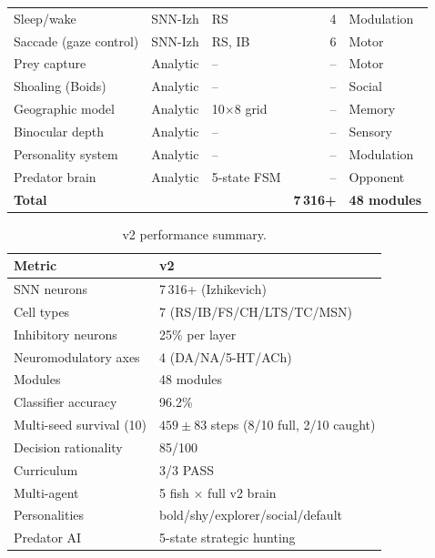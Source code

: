 \documentclass[12pt]{article}
\begin{document}
\begin{table}[H]
\begin{tabular}{lllrl}
Sleep/wake                & SNN-Izh   & RS          & 4      & Modulation \\
Saccade (gaze control)    & SNN-Izh   & RS, IB      & 6      & Motor \\
Prey capture              & Analytic  & --          & --     & Motor \\
Shoaling (Boids)          & Analytic  & --          & --     & Social \\
Geographic model          & Analytic  & 10$\times$8 grid & --  & Memory \\
Binocular depth           & Analytic  & --          & --     & Sensory \\
Personality system        & Analytic  & --          & --     & Modulation \\
Predator brain            & Analytic  & 5-state FSM & --     & Opponent \\
\midrule
\textbf{Total}            &           &             & \textbf{7\,316+} & \textbf{48 modules} \\
\bottomrule
\end{tabular}
\end{table}

\begin{table}[H]
\centering
\caption{v2 performance summary.}
\label{tab:v2summary}
\small
\begin{tabular}{ll}
\toprule
Metric & v2 \\
\midrule
SNN neurons              & 7\,316+ (Izhikevich) \\
Cell types               & 7 (RS/IB/FS/CH/LTS/TC/MSN) \\
Inhibitory neurons       & 25\% per layer \\
Neuromodulatory axes     & 4 (DA/NA/5-HT/ACh) \\
Modules                  & 48 modules \\
Classifier accuracy      & 96.2\% \\
Multi-seed survival (10) & $459 \pm 83$ steps (8/10 full, 2/10 caught) \\
Decision rationality     & 85/100 \\
Curriculum               & 3/3 PASS \\
Multi-agent              & 5 fish $\times$ full v2 brain \\
Personalities            & bold/shy/explorer/social/default \\
Predator AI              & 5-state strategic hunting \\
\bottomrule
\end{tabular}
\end{table}
\end{document}
